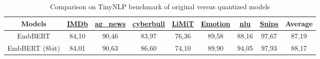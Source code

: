 \begin{table*}[htbp]
    \caption{Comparison on TinyNLP benchmark of original versus quantized models}
    \begin{center}    
    
        \begin{tabular}{| c | c  c  c  c  c  c  c | c |}
        \hline
        \textbf{Models}&
        \href{https://huggingface.co/datasets/stanfordnlp/imdb}{\textbf{IMDb}} &
        \href{https://huggingface.co/datasets/fancyzhx/ag_news}{\textbf{ag\_news}}  &
        \href{https://www.kaggle.com/datasets/andrewmvd/cyberbullying-classification}{\textbf{cyberbull}}  &
        \href{https://huggingface.co/datasets/IBM/limit}{\textbf{LiMiT}} &
        \href{https://huggingface.co/datasets/dair-ai/emotion}{\textbf{Emotion}} &
        \href{https://huggingface.co/datasets/xingkunliuxtracta/nlu_evaluation_data}{\textbf{nlu}} &
        \href{https://huggingface.co/datasets/benayas/snips}{\textbf{Snips}} &
        \textbf{Average} \\
        \hline\hline
        
        EmbBERT          & 84,10 & 90,46 & 83,97 & 76,36 & 89,58 & 88,16 & 97,67 & 87,19 \\
        \hline 
        EmbBERT (8bit)      & 84,01 & 90,63 & 86,60 & 74,10 & 89,90 & 94,05 & 97,93 & 88,17 \\

        \hline
        \end{tabular}

    \label{table:res_tiny_quant}
    \end{center}
    
\end{table*}





